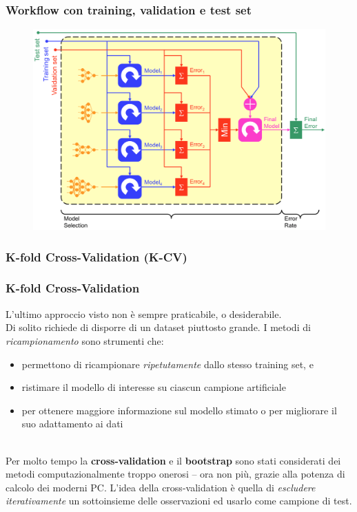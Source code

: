 \begin{frame}

	\frametitle{Workflow con training, validation e test set}
	\begin{figure}[!htbp]
		\centering
		\includegraphics[width=0.85\linewidth]{images/supervised/validation_test_splitting_data/Workflow.png}
	\end{figure}
\end{frame}




\subsubsection[K-fold Cross-Validation]{K-fold Cross-Validation (K-CV)}

\begin{frame}

	\frametitle{K-fold Cross-Validation}

	L'ultimo approccio visto non è sempre praticabile, o desiderabile.\\
	Di solito richiede di disporre di un dataset piuttosto grande.
	\newlinedouble
	I metodi di \emph{ricampionamento} sono strumenti che:
	\begin{itemize}
		\item permettono di ricampionare \emph{ripetutamente} dallo stesso training set, e
		\item ristimare il modello di interesse su ciascun campione artificiale
		\item per ottenere maggiore informazione sul modello stimato o per migliorare il suo adattamento ai dati
	\end{itemize}
	\ \\
	Per molto tempo la \textbf{cross-validation} e il \textbf{bootstrap} sono stati considerati dei metodi computazionalmente troppo onerosi -- ora non più, grazie alla potenza di calcolo dei moderni PC.
	\newline
	L'idea della cross-validation è quella di \emph{escludere iterativamente} un sottoinsieme delle osservazioni ed usarlo come campione di test.
\end{frame}


